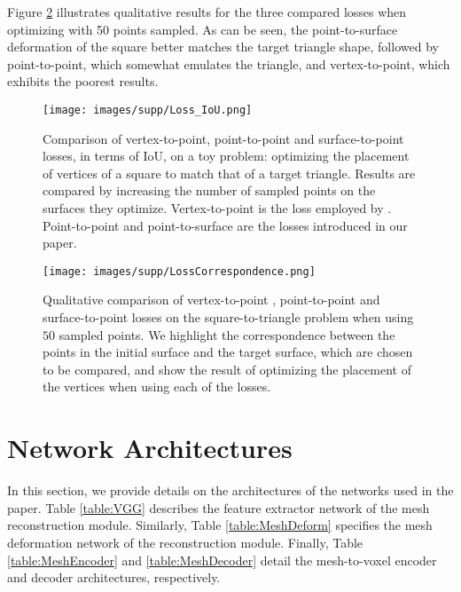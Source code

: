 \documentclass{article}
\begin{document}
Figure \ref{fig:SecondLossComparison} illustrates qualitative results for the three compared losses when optimizing with 50 points sampled. As can be seen, the point-to-surface deformation of the square better matches the target triangle shape, followed by point-to-point, which somewhat emulates the triangle, and vertex-to-point, which exhibits the poorest results.

\vspace{-2mm}
\begin{figure}[h!]
\centering
\texttt{[image: images/supp/Loss\_IoU.png]}
\vspace{-2mm}
\caption{Comparison of vertex-to-point, point-to-point and surface-to-point losses, in terms of IoU, on a toy problem: optimizing the placement of vertices of a square to match that of a target triangle. Results are compared by increasing the number of sampled points on the surfaces they optimize. Vertex-to-point is the loss employed by \citet{Pixel2Mesh}. Point-to-point and point-to-surface are the losses introduced in our paper. } \label{fig:Loss_graph}
\end{figure}

\vspace{-2mm}
\begin{figure}[h!]
\centering
\texttt{[image: images/supp/LossCorrespondence.png]}
\vspace{-2mm}
\caption{Qualitative comparison of vertex-to-point \cite{Pixel2Mesh}, point-to-point and surface-to-point losses on the square-to-triangle problem when using $50$ sampled points. We highlight the correspondence between the points in the initial surface and the target surface, which are chosen to be compared, and show the result of optimizing the placement of the vertices when using each of the losses.} \label{fig:SecondLossComparison}
\end{figure}

\clearpage

\section{Network Architectures}

In this section, we provide details on the architectures of the networks used in the paper. Table \ref{table:VGG} describes the feature extractor network of the mesh reconstruction module. Similarly, Table \ref{table:MeshDeform} specifies the mesh deformation network of the reconstruction module. Finally, Table \ref{table:MeshEncoder} and \ref{table:MeshDecoder} detail the mesh-to-voxel encoder and decoder architectures, respectively. 
\end{document}
